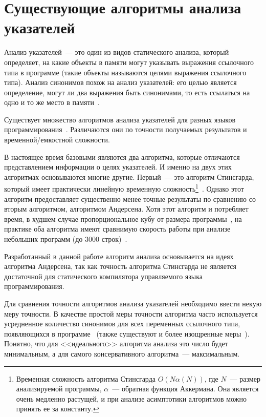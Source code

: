 \documentclass[14pt,titlepage,draft]{extarticle}
\begin{document}
  \section{Существующие алгоритмы анализа указателей}

    Анализ указателей~--- это один из видов статического анализа, который
    определяет, на какие объекты в памяти могут указывать выражения
    ссылочного типа в программе (такие объекты называются целями выражения
    ссылочного типа). Анализ синонимов похож на анализ указателей: его целью
    является определение, могут ли два выражения быть синонимами, то есть
    ссылаться на одно и то же место в памяти~\cite{andersen}.

    Существует множество алгоритмов анализа указателей для разных языков
    программирования~\cite{hind_pointer_analysis_not_solved_yet}. Различаются
    они по точности получаемых результатов и временной/емкостной сложности.

    В настоящее время базовыми являются два алгоритма, которые отличаются
    представлением информации о целях указателей. И именно на двух этих
    алгоритмах основываются многие другие.
    Первый~--- это алгоритм Стинсгарда, который имеет
    практически линейную временную сложность\footnote{
      Временная сложность алгоритма Стинсгарда
      $O(N \alpha(N))$, где $N$~--- размер анализируемой программы,
      $\alpha$~--- обратная функция Аккермана. Она является очень медленно
      растущей, и при анализе асимптотики алгоритмов можно принять ее за
      константу.
    }~\cite{steensgaard}. Однако этот алгоритм предоставляет существенно менее
    точные результаты по сравнению со вторым алгоритмом, алгоритмом
    Андерсена. Хотя этот алгоритм и потребляет время, в худшем случае
    пропорциональное кубу от размера программы~\cite{andersen}, на практике оба
    алгоритма имеют сравнимую скорость работы при анализе небольших программ
    (до \num{3000} строк)~\cite{shapiro_fast_and_accurate}.

    Разработанный в данной работе алгоритм анализа основывается на идеях
    алгоритма Андерсена, так как точность алгоритма Стинсгарда не является
    достаточной для статического компилятора управляемого языка
    программирования.

    Для сравнения точности алгоритмов анализа указателей необходимо ввести
    некую меру точности. В качестве простой меры точности алгоритма часто
    используется усредненное количество синонимов для всех переменных
    ссылочного типа, появляющихся в
    программе~\cite[раздел~3.2]{hind_pointer_analysis_not_solved_yet}
    (также существуют и более изощренные
    меры~\cite{hind_pointer_analysis_not_solved_yet,diwan_tbaa}).
    Понятно, что для <<идеального>> алгоритма анализа это число будет
    минимальным, а для самого консервативного алгоритма~--- максимальным.
\end{document}

